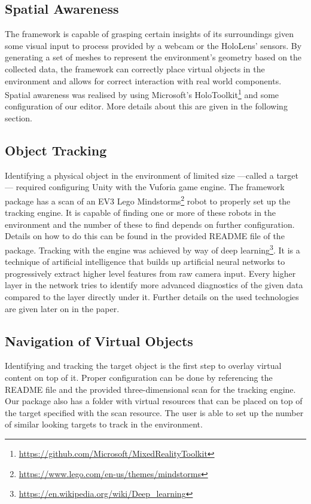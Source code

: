 \subsection{Spatial Awareness}
The framework is capable of grasping certain insights of its surroundings given some visual input to process provided by a webcam or the HoloLens' sensors. By generating a set of meshes to represent the environment's geometry based on the collected data, the framework can correctly place virtual objects in the environment and allows for correct interaction with real world components. Spatial awareness was realised by using Microsoft's HoloToolkit\footnote{\protect\url{https://github.com/Microsoft/MixedRealityToolkit}} and some configuration of our editor. More details about this are given in the following section.


\subsection{Object Tracking}
Identifying a physical object in the environment of limited size ---called a target--- required configuring Unity with the Vuforia game engine. The framework package has a scan of an EV3 Lego Mindstorms\footnote{\protect\url{https://www.lego.com/en-us/themes/mindstorms}} robot to properly set up the tracking engine. It is capable of finding one or more of these robots in the environment and the number of these to find depends on further configuration. Details on how to do this can be found in the provided README file of the package. Tracking with the engine was achieved by way of deep learning\footnote{\protect\url{https://en.wikipedia.org/wiki/Deep_learning}}. It is a technique of artificial intelligence that builds up artificial neural networks to progressively extract higher level features from raw camera input. Every higher layer in the network tries to identify more advanced diagnostics of the given data compared to the layer directly under it. Further details on the used technologies are given later on in the paper.

\subsection{Navigation of Virtual Objects}
Identifying and tracking the target object is the first step to overlay virtual content on top of it. Proper configuration can be done by referencing the README file and the provided three-dimensional scan for the tracking engine. Our package also has a folder with virtual resources that can be placed on top of the target specified with the scan resource. The user is able to set up the number of similar looking targets to track in the environment.


